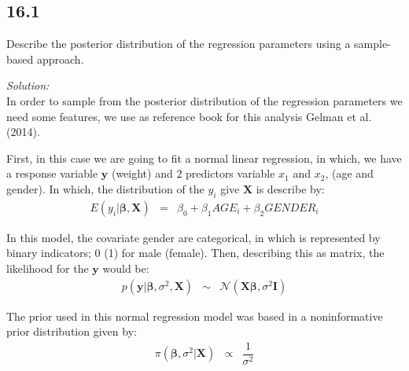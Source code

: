 \documentclass[a4paper, 11pt]{article}
\begin{document}



\subsection*{16.1} Describe the posterior distribution of the regression parameters using a sample-based approach.

\noindent
\textit{Solution:}\\

In order to sample from the posterior distribution of the regression parameters we need some features, we use as reference book for this analysis Gelman et al. (2014).

First, in this case we are going to fit a normal linear regression, in which, we have a response variable $\textbf{y}$ (weight) and $2$ predictors variable $x_1$ and $x_2$, (age and gender). In which, the distribution of the $y_i$ give $\textbf{X}$ is describe by:
\begin{equation*}
\begin{array}{lclll}
E(y_i|\boldsymbol{\beta},\textbf{X}) & = & \beta_0 + \beta_1 AGE_i + \beta_2 GENDER_i
\end{array}
\end{equation*}

In this model, the covariate gender are categorical, in which is represented by binary indicators; 0 (1) for male (female).
Then, describing this as matrix, the likelihood for the $\textbf{y}$ would be:
\begin{equation*}
\begin{array}{lclll}
p(\textbf{y}|\boldsymbol{\beta},\sigma^2,\textbf{X}) & \sim & \mathcal{N}(\textbf{X}\boldsymbol{\beta},\sigma^2\textbf{I})
\end{array}
\end{equation*}

The prior used in this normal regression model was based in a noninformative prior distribution given by:
\begin{equation*}
\begin{array}{lclll}
\pi(\boldsymbol{\beta},\sigma^2|\textbf{X}) & \propto & \dfrac{1}{\sigma^2}
\end{array}
\end{equation*}
\end{document}

